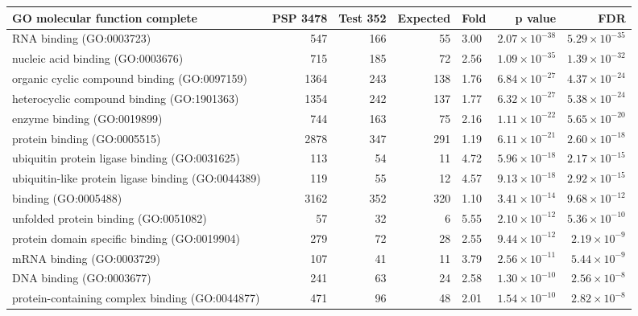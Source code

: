 \begin{table}[ht]
\centering
\begin{adjustbox}{width=\textwidth}
\begin{tabular}{lrrrlrr}
  \hline
GO molecular function complete & PSP 3478 & Test 352 & Expected & Fold & p value & FDR \\ 
  \hline
RNA binding (GO:0003723) & 547 & 166 & 55 & 3.00 & $2.07 \times 10^{-38}$ & $5.29 \times 10^{-35}$ \\ 
  nucleic acid binding (GO:0003676) & 715 & 185 & 72 & 2.56 & $1.09 \times 10^{-35}$ & $1.39 \times 10^{-32}$ \\ 
  organic cyclic compound binding (GO:0097159) & 1364 & 243 & 138 & 1.76 & $6.84 \times 10^{-27}$ & $4.37 \times 10^{-24}$ \\ 
  heterocyclic compound binding (GO:1901363) & 1354 & 242 & 137 & 1.77 & $6.32 \times 10^{-27}$ & $5.38 \times 10^{-24}$ \\ 
  enzyme binding (GO:0019899) & 744 & 163 & 75 & 2.16 & $1.11 \times 10^{-22}$ & $5.65 \times 10^{-20}$ \\ 
  protein binding (GO:0005515) & 2878 & 347 & 291 & 1.19 & $6.11 \times 10^{-21}$ & $2.60 \times 10^{-18}$ \\ 
  ubiquitin protein ligase binding (GO:0031625) & 113 & 54 & 11 & 4.72 & $5.96 \times 10^{-18}$ & $2.17 \times 10^{-15}$ \\ 
  ubiquitin-like protein ligase binding (GO:0044389) & 119 & 55 & 12 & 4.57 & $9.13 \times 10^{-18}$ & $2.92 \times 10^{-15}$ \\ 
  binding (GO:0005488) & 3162 & 352 & 320 & 1.10 & $3.41 \times 10^{-14}$ & $9.68 \times 10^{-12}$ \\ 
  unfolded protein binding (GO:0051082) & 57 & 32 & 6 & 5.55 & $2.10 \times 10^{-12}$ & $5.36 \times 10^{-10}$ \\ 
  protein domain specific binding (GO:0019904) & 279 & 72 & 28 & 2.55 & $9.44 \times 10^{-12}$ & $2.19 \times 10^{-9}$ \\ 
  mRNA binding (GO:0003729) & 107 & 41 & 11 & 3.79 & $2.56 \times 10^{-11}$ & $5.44 \times 10^{-9}$ \\ 
  DNA binding (GO:0003677) & 241 & 63 & 24 & 2.58 & $1.30 \times 10^{-10}$ & $2.56 \times 10^{-8}$ \\ 
  protein-containing complex binding (GO:0044877) & 471 & 96 & 48 & 2.01 & $1.54 \times 10^{-10}$ & $2.82 \times 10^{-8}$ \\ 

\end{tabular}
\end{adjustbox}
\end{table}
